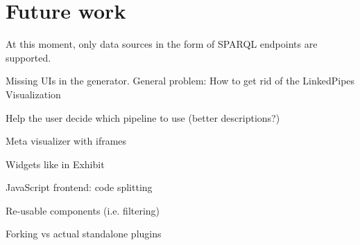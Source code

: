 \chapter{Future work}

At this moment, only data sources in the form of SPARQL endpoints are supported.

Missing UIs in the generator. General problem: How to get rid of the LinkedPipes Visualization

Help the user decide which pipeline to use (better descriptions?)

Meta visualizer with iframes

Widgets like in Exhibit

JavaScript frontend: code splitting

Re-usable components (i.e. filtering)

Forking vs actual standalone plugins